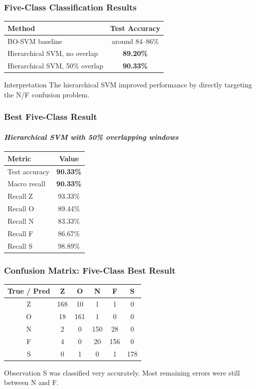 \documentclass{beamer}
\begin{document}
\begin{frame}
\frametitle{Five-Class Classification Results}
\begin{table}
\centering
\begin{tabular}{lc}
\toprule
Method & Test Accuracy\\
\midrule
BO-SVM baseline & around 84--86\%\\
Hierarchical SVM, no overlap & \textbf{89.20\%}\\
Hierarchical SVM, 50\% overlap & \textbf{90.33\%}\\
\bottomrule
\end{tabular}
\end{table}

\begin{block}{Interpretation}
The hierarchical SVM improved performance by directly targeting the N/F confusion problem.
\end{block}
\end{frame}

\begin{frame}
\frametitle{Best Five-Class Result}
\framesubtitle{\it{Hierarchical SVM with 50\% overlapping windows}}
\begin{table}
\centering
\begin{tabular}{lc}
\toprule
Metric & Value\\
\midrule
Test accuracy & \textbf{90.33\%}\\
Macro recall & \textbf{90.33\%}\\
Recall Z & 93.33\%\\
Recall O & 89.44\%\\
Recall N & 83.33\%\\
Recall F & 86.67\%\\
Recall S & 98.89\%\\
\bottomrule
\end{tabular}
\end{table}
\end{frame}

\begin{frame}
\frametitle{Confusion Matrix: Five-Class Best Result}
\begin{center}
\begin{tabular}{c|ccccc}
\toprule
True / Pred & Z & O & N & F & S\\
\midrule
Z & 168 & 10 & 1 & 1 & 0\\
O & 18 & 161 & 1 & 0 & 0\\
N & 2 & 0 & 150 & 28 & 0\\
F & 4 & 0 & 20 & 156 & 0\\
S & 0 & 1 & 0 & 1 & 178\\
\bottomrule
\end{tabular}
\end{center}

\begin{block}{Observation}
S was classified very accurately. Most remaining errors were still between N and F.
\end{block}
\end{frame}
\end{document}
